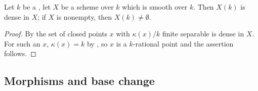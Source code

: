 \begin{lemma}
\label{lem:pc-rational-points-dense}
Let $k$ be a ,
let $X$ be a scheme over $k$ which is smooth over $k$.  Then $X(k)$ is
dense in $X$; if $X$ is nonempty, then $X(k)\neq\emptyset$.
\end{lemma}
\begin{proof}
By  the set of closed points $x$ with
$\kappa(x)/k$ finite separable is dense in $X$.  For such an $x$,
$\kappa(x)=k$ by , so $x$ is a
$k$-rational point and the assertion follows.
\end{proof}






\subsection{Morphisms and base change}


